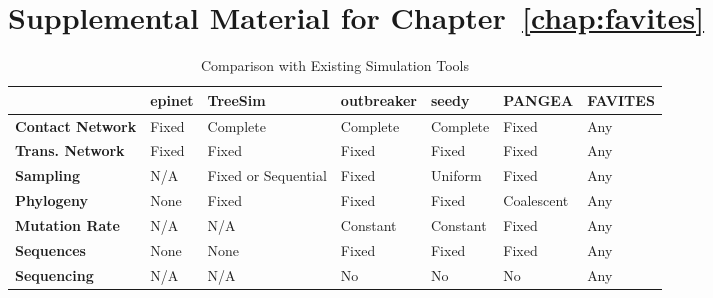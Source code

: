 \chapter{Supplemental Material for Chapter~\ref{chap:favites}}
\label{chap:favites-sup}
\clearpage

\begin{table}[!ht] %
\caption[Comparison with Existing Simulation Tools]{Comparison with Existing Simulation Tools}
\vspace{-0.25in}
\begin{center}
\begin{tabular}{|P{0.8in}|P{0.5in}|P{0.8in}|P{0.8in}|P{0.6in}|P{0.8in}|P{0.8in}|}
\hline
 & \textbf{epinet} & \textbf{TreeSim} & \textbf{outbreaker} & \textbf{seedy} & \textbf{PANGEA} & \textbf{FAVITES} \\
\hline
\textbf{Contact Network} & Fixed & Complete & Complete & Complete & Fixed & Any \\
\hline
\textbf{Trans. Network} & Fixed & Fixed & Fixed & Fixed & Fixed & Any\\
\hline
\textbf{Sampling} & N/A & Fixed or \newline Sequential & Fixed & Uniform & Fixed & Any \\
\hline
\textbf{Phylogeny} & None & Fixed & Fixed & Fixed & Coalescent & Any \\
\hline
\textbf{Mutation Rate} & N/A & N/A & Constant & Constant & Fixed & Any \\
\hline
\textbf{Sequences} & None & None & Fixed & Fixed & Fixed & Any \\
\hline
\textbf{Sequencing} & N/A & N/A & No & No & No & Any \\
\hline
\end{tabular}
\end{center}
\label{tab:favites-comparison}
\end{table}

